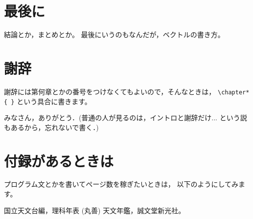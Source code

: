 \documentclass[b5paper,12pt]{jsreport}
\begin{document}
\chapter{最後に}

結論とか，まとめとか。
最後にいうのもなんだが，ベクトルの書き方。


\chapter*{謝辞}

謝辞には第何章とかの番号をつけなくてもよいので，そんなときは，
\verb|\chapter*{ }| という具合に書きます。

みなさん，ありがとう．(普通の人が見るのは，イントロと謝辞だけ... 
という説もあるから，忘れないで書く．)

\appendix
\chapter{付録があるときは}
プログラム文とかを書いてページ数を稼ぎたいときは，
以下のようにしてみます。


\begin{thebibliography}{99}
 国立天文台編，理科年表 (丸善)
 天文年鑑，誠文堂新光社。
\end{thebibliography}
\end{document}
